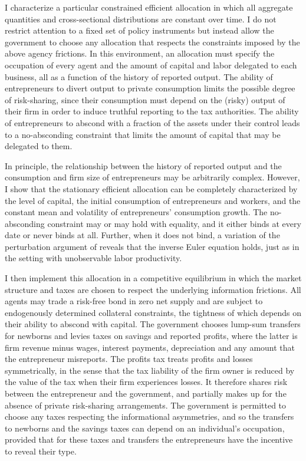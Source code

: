\documentclass[11pt]{article}
\theoremstyle{plain}
\theoremstyle{definition} %
\begin{document}
I characterize a particular constrained efficient allocation in which all aggregate quantities and cross-sectional distributions are constant over time. I do not restrict attention to a fixed set of policy instruments but instead allow the government to choose any allocation that respects the constraints imposed by the above agency frictions. In this environment, an allocation must specify the occupation of every agent and the amount of capital and labor delegated to each business, all as a function of the history of reported output. The ability of entrepreneurs to divert output to private consumption limits the possible degree of risk-sharing, since their consumption must depend on the (risky) output of their firm in order to induce truthful reporting to the tax authorities. The ability of entrepreneurs to abscond with a fraction of the assets under their control leads to a no-absconding constraint that limits the amount of capital that may be delegated to them.

In principle, the relationship between the history of reported output and the consumption and firm size of entrepreneurs may be arbitrarily complex. However, I show that the stationary efficient allocation can be completely characterized by the level of capital, the initial consumption of entrepreneurs and workers, and the constant mean and volatility of entrepreneurs' consumption growth. The no-absconding constraint may or may hold with equality, and it either binds at every date or never binds at all. Further, when it does not bind, a variation of the perturbation argument of \cite{rogerson_repeated_1985} reveals that the inverse Euler equation holds, just as in the setting with unobservable labor productivity. 

I then implement this allocation in a competitive equilibrium in which the market structure and taxes are chosen to respect the underlying information frictions. All agents may trade a risk-free bond in zero net supply and are subject to endogenously determined collateral constraints, the tightness of which depends on their ability to abscond with capital. The government chooses lump-sum transfers for newborns and levies taxes on savings and reported profits, where the latter is firm revenue minus wages, interest payments, depreciation and any amount that the entrepreneur misreports. The profits tax treats profits and losses symmetrically, in the sense that the tax liability of the firm owner is reduced by the value of the tax when their firm experiences losses. It therefore shares risk between the entrepreneur and the government, and partially makes up for the absence of private risk-sharing arrangements. The government is permitted to choose any taxes respecting the informational asymmetries, and so the transfers to newborns and the savings taxes can depend on an individual's occupation, provided that for these taxes and transfers the entrepreneurs have the incentive to reveal their type. 
\end{document}
